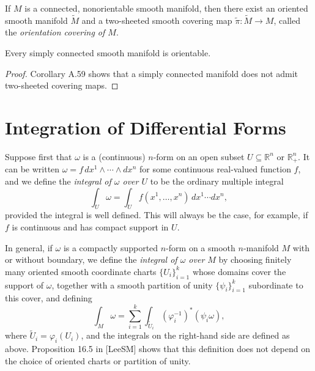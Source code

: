 \begin{proposition}
\label{prop:orientation-covering-theorem}
If $M$ is a connected, nonorientable smooth manifold, then there exist an oriented smooth manifold $\tilde{M}$ and a two-sheeted smooth covering map $\tilde{\pi}: \tilde{M} \to M$, called the \emph{orientation covering of $M$}.
\end{proposition}

\begin{corollary}
\label{cor:simply-connected-orientable}
Every simply connected smooth manifold is orientable.
\end{corollary}

\begin{proof}
Corollary A.59 shows that a simply connected manifold does not admit two-sheeted covering maps.
\end{proof}

\section{Integration of Differential Forms}

Suppose first that $\omega$ is a (continuous) $n$-form on an open subset $U \subseteq \mathbb{R}^n$ or $\mathbb{R}^n_+$. It can be written $\omega = f \, dx^1 \wedge \cdots \wedge dx^n$ for some continuous real-valued function $f$, and we define the \emph{integral of $\omega$ over $U$} to be the ordinary multiple integral
\[
\int_U \omega = \int_U f(x^1,\ldots,x^n) \, dx^1 \cdots dx^n,
\]
provided the integral is well defined. This will always be the case, for example, if $f$ is continuous and has compact support in $U$.

In general, if $\omega$ is a compactly supported $n$-form on a smooth $n$-manifold $M$ with or without boundary, we define the \emph{integral of $\omega$ over $M$} by choosing finitely many oriented smooth coordinate charts $\{U_i\}_{i=1}^k$ whose domains cover the support of $\omega$, together with a smooth partition of unity $\{\psi_i\}_{i=1}^k$ subordinate to this cover, and defining
\[
\int_M \omega = \sum_{i=1}^k \int_{\tilde{U}_i} (\varphi_i^{-1})^*(\psi_i\omega),
\]
where $\tilde{U}_i = \varphi_i(U_i)$, and the integrals on the right-hand side are defined as above. Proposition 16.5 in [LeeSM] shows that this definition does not depend on the choice of oriented charts or partition of unity.

